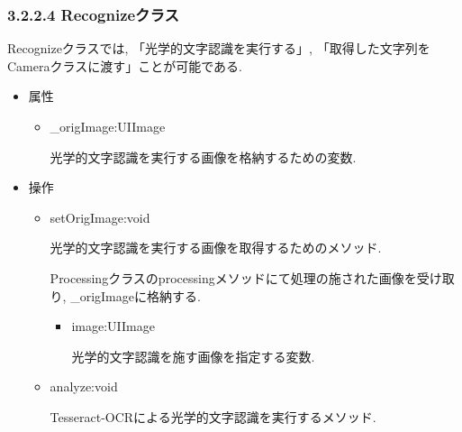 \subsubsection{3.2.2.4 Recognizeクラス}
Recognizeクラスでは, 「光学的文字認識を実行する」, 「取得した文字列をCameraクラスに渡す」ことが可能である.

\begin{itemize}
\item 属性

\begin{itemize}
\item \_origImage:UIImage

光学的文字認識を実行する画像を格納するための変数.
\end{itemize}

\item 操作

\begin{itemize}
\item setOrigImage:void

光学的文字認識を実行する画像を取得するためのメソッド.

Processingクラスのprocessingメソッドにて処理の施された画像を受け取り, \_origImageに格納する.
\begin{itemize}
\item image:UIImage

光学的文字認識を施す画像を指定する変数.
\end{itemize}

\item analyze:void

Tesseract-OCRによる光学的文字認識を実行するメソッド.
\end{itemize}

\end{itemize}

